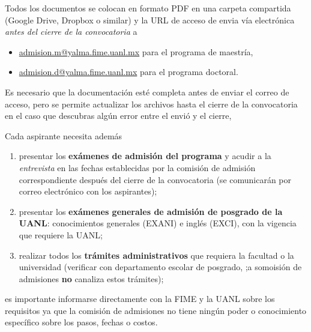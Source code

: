 \documentclass{article}
\begin{document}
\begin{Form}
Todos los documentos se colocan en formato PDF en una carpeta
compartida (Google Drive, Dropbox o similar) y la URL de acceso de
envia vía electrónica {\em antes del cierre de la convocatoria} a
\begin{itemize}
\item \url{admision.m@yalma.fime.uanl.mx} para el programa de maestría,
\item \url{admision.d@yalma.fime.uanl.mx} para el programa doctoral.
\end{itemize}
Es necesario que la documentación esté completa antes de enviar el
correo de acceso, pero se permite actualizar los archivos hasta el
cierre de la convocatoria en el caso que descubras algún error entre
el envió y el cierre,

Cada aspirante necesita además
\begin{enumerate}
\item presentar los {\bf exámenes de admisión del programa} y acudir a la
  {\em entrevista} en las fechas establecidas por la comisión de admisión
  correspondiente después del cierre de la convocatoria (se
  comunicarán por correo electrónico con los aspirantes);
\item presentar los {\bf exámenes generales de admisión de posgrado de
  la UANL}: conocimientos generales (EXANI) e inglés (EXCI), con la
  vigencia que requiere la UANL;
\item realizar todos los {\bf trámites administrativos} que requiera
  la facultad o la universidad (verificar con departamento escolar de
  posgrado, ;a somoisión de admisiones {\bf no} canaliza estos
  trámites);
\end{enumerate}
es importante informarse directamente con la FIME y la UANL sobre los
requisitos ya que la comisión de admisiones no tiene ningún poder o
conocimiento específico sobre los pasos, fechas o costos.

\end{Form}
\end{document}
